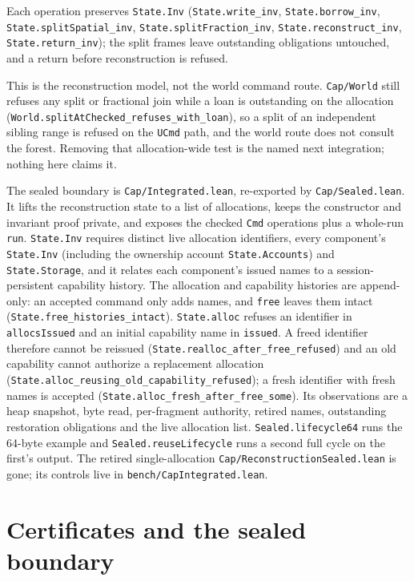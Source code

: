 \documentclass[10pt,a4paper]{article}
\newcommand{\file}[1]{\texttt{#1}}
\newcommand{\lean}[1]{\texttt{#1}}
\begin{document}
Each operation preserves \lean{State.Inv} (\lean{State.write\_inv},
\lean{State.borrow\_inv}, \lean{State.splitSpatial\_inv},
\lean{State.splitFraction\_inv}, \lean{State.reconstruct\_inv},
\lean{State.return\_inv}); the split frames leave outstanding obligations
untouched, and a return before reconstruction is refused.

This is the reconstruction model, not the world command route. \file{Cap/World}
still refuses any split or fractional join while a loan is outstanding on the
allocation (\lean{World.splitAtChecked\_refuses\_with\_loan}), so a split of an
independent sibling range is refused on the \lean{UCmd} path, and the world
route does not consult the forest. Removing that allocation-wide test is the
named next integration; nothing here claims it.

The sealed boundary is \file{Cap/Integrated.lean}, re-exported by
\file{Cap/Sealed.lean}. It lifts the reconstruction state to a list of
allocations, keeps the constructor and invariant proof private, and exposes the
checked \lean{Cmd} operations plus a whole-run \lean{run}. \lean{State.Inv}
requires distinct live allocation identifiers, every component's
\lean{State.Inv} (including the ownership account \lean{State.Accounts}) and
\lean{State.Storage}, and it relates each component's issued names to a
session-persistent capability history. The allocation and capability histories
are append-only: an accepted command only adds names, and \lean{free} leaves
them intact (\lean{State.free\_histories\_intact}). \lean{State.alloc} refuses an
identifier in \lean{allocsIssued} and an initial capability name in
\lean{issued}. A freed identifier therefore cannot be reissued
(\lean{State.realloc\_after\_free\_refused}) and an old capability cannot
authorize a replacement allocation
(\lean{State.alloc\_reusing\_old\_capability\_refused}); a fresh identifier with
fresh names is accepted (\lean{State.alloc\_fresh\_after\_free\_some}).
Its observations are a heap snapshot, byte read, per-fragment authority, retired
names, outstanding restoration obligations and the live allocation list.
\lean{Sealed.lifecycle64} runs the 64-byte example and
\lean{Sealed.reuseLifecycle} runs a second full cycle on the first's output. The
retired single-allocation \file{Cap/ReconstructionSealed.lean} is gone; its
controls live in \file{bench/CapIntegrated.lean}.

\section{Certificates and the sealed boundary}
\end{document}

